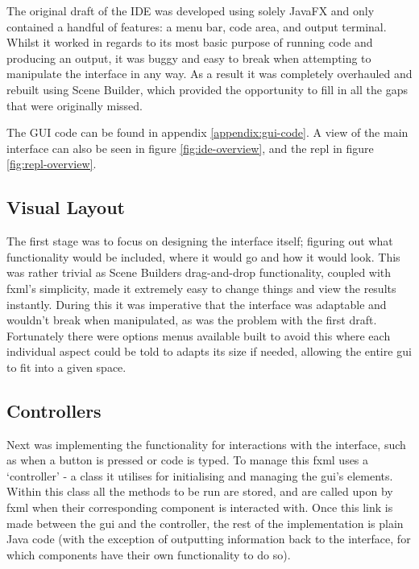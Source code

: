 \documentclass[
]{report}
\begin{document}
The original draft of the IDE was developed using solely JavaFX and only
contained a handful of features: a menu bar, code area, and output
terminal. Whilst it worked in regards to its most basic purpose of
running code and producing an output, it was buggy and easy to break
when attempting to manipulate the interface in any way. As a result it
was completely overhauled and rebuilt using Scene Builder, which
provided the opportunity to fill in all the gaps that were originally
missed.

The GUI code can be found in appendix \ref{appendix:gui-code}. A view of the
main interface can also be seen in figure \ref{fig:ide-overview}, and the
\acrshort{repl} in figure \ref{fig:repl-overview}.

\subsection{Visual Layout}
The first stage was to focus on designing the interface itself; figuring
out what functionality would be included, where it would go and how it
would look. This was rather trivial as Scene Builders drag-and-drop
functionality, coupled with \acrshort{fxml}'s simplicity, made it extremely easy to
change things and view the results instantly. During this it was
imperative that the interface was adaptable and wouldn't break when
manipulated, as was the problem with the first draft. Fortunately there
were options menus available built to avoid this where each individual
aspect could be told to adapts its size if needed, allowing the entire
\acrshort{gui} to fit into a given space.

\subsection{Controllers}
Next was implementing the functionality for interactions with the
interface, such as when a button is pressed or code is typed. To manage
this \acrshort{fxml} uses a `controller' - a class it utilises for initialising and
managing the \acrshort{gui}'s elements. Within this class all the methods to be run
are stored, and are called upon by \acrshort{fxml} when their corresponding
component is interacted with. Once this link is made between the \acrshort{gui} and
the controller, the rest of the implementation is plain Java code (with
the exception of outputting information back to the interface, for which
components have their own functionality to do so).
\end{document}
